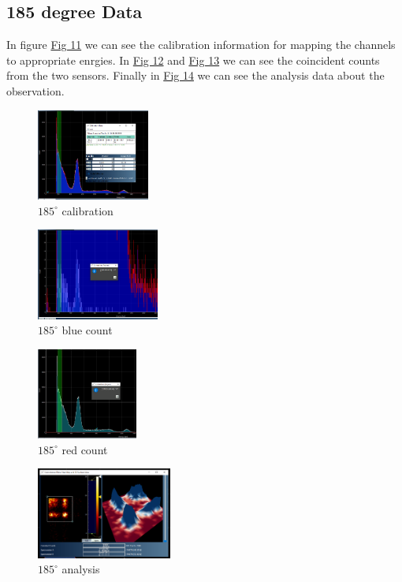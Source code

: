 	\subsection{185 degree Data}
		In figure \hyperref[obs:185cal]{Fig 11} we can see the calibration information for mapping the channels to appropriate enrgies. In \hyperref[obs:185blue]{Fig 12} and \hyperref[obs:185red]{Fig 13} we can see the coincident counts from the two sensors. Finally in \hyperref[obs:185]{Fig 14} we can see the analysis data about the observation.
		\begin{figure}[H]
			\centering
			\includegraphics[width=0.7\columnwidth, height=3cm]{images/185_cal.png}
			\caption{$185^\circ$ calibration}
			\label{obs:185cal}
		\end{figure}
		\begin{figure}[H]
			\centering
			\includegraphics[width=0.7\columnwidth, height=3cm]{images/185blue.png}
			\caption{$185^\circ$ blue count}
			\label{obs:185blue}
		\end{figure}
		\begin{figure}[H]
			\centering
			\includegraphics[width=0.7\columnwidth, height=3cm]{images/185red.png}
			\caption{$185^\circ$ red count}
			\label{obs:185red}
		\end{figure}
		\begin{figure}[H]
			\centering
			\includegraphics[width=0.7\columnwidth, height=3cm]{images/185.png}
			\caption{$185^\circ$ analysis}
			\label{obs:185}
		\end{figure}

